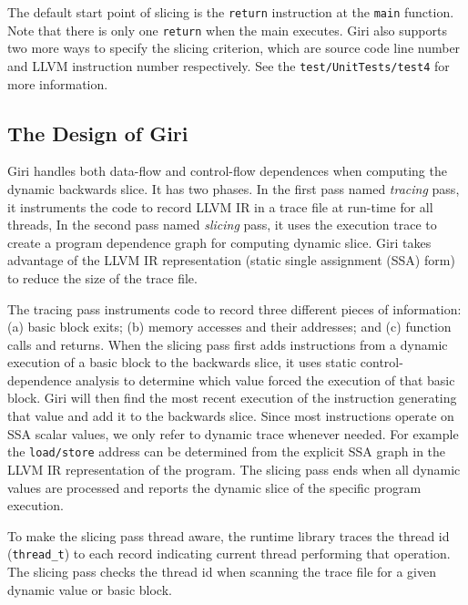 \documentclass[DIV=calc, paper=a4, fontsize=11pt, twocolumn]{scrartcl}
\begin{document}
The default start point of slicing is the \texttt{return} instruction at the \texttt{main} function.
Note that there is only one \texttt{return} when the main executes.
Giri also supports two more ways to specify the slicing criterion, which are source code line number and LLVM instruction number respectively.
See the \texttt{test/UnitTests/test4} for more information.

\subsection{The Design of Giri}
Giri handles both data-flow and control-flow dependences when computing the dynamic backwards slice. 
It has two phases.
In the first pass named \emph{tracing} pass, it instruments the code to record LLVM IR in a trace file at run-time for all threads,
In the second pass named \emph{slicing} pass, it uses the execution trace to create a program dependence graph for computing dynamic slice.
Giri takes advantage of the LLVM IR representation (static single assignment (SSA) form) to reduce the size of the trace file. 

The tracing pass instruments code to record three different pieces of information:
(a) basic block exits; (b) memory accesses and their addresses; and (c) function calls and returns.
When the slicing pass first adds instructions from a dynamic execution of a basic block to the backwards slice,
it uses static control-dependence analysis to determine which value forced the execution of that basic block.
Giri will then find the most recent execution of the instruction generating that value and add it to the backwards slice.
Since most instructions operate on SSA scalar values, we only refer to dynamic trace whenever needed.
For example the \texttt{load/store} address can be determined from the explicit SSA graph in the LLVM IR representation of the program.
The slicing pass ends when all dynamic values are processed and reports the dynamic slice of the specific program execution.

To make the slicing pass thread aware,
the runtime library traces the thread id (\texttt{thread\_t}) to each record indicating current thread performing that operation.
The slicing pass checks the thread id when scanning the trace file for a given dynamic value or basic block.

\end{document}
